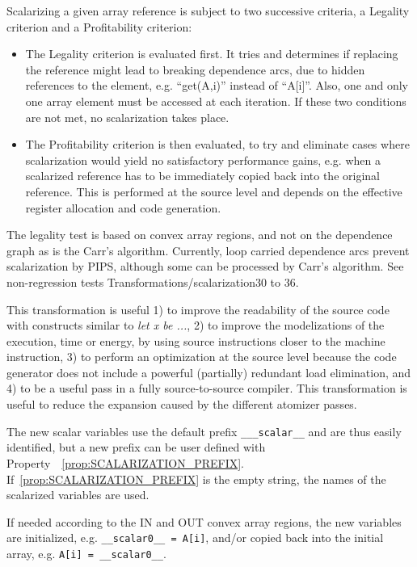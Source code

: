 \documentclass[a4paper]{report}
\newcommand{\PipsPropRef}[1]{\texttt{\detokenize{#1}}~\ref{prop:#1}}
\begin{document}
Scalarizing a given array reference is subject to two successive
criteria, a Legality criterion and a Profitability criterion:

\begin{itemize}
\item The Legality criterion is evaluated first. It tries and
  determines if replacing the reference might lead to breaking
  dependence arcs, due to hidden references to the element,
  e.g. ``get(A,i)'' instead of ``A[i]''. Also, one and only one array
  element must be accessed at each iteration. If these two conditions
  are not met, no scalarization takes place.

\item The Profitability criterion is then evaluated, to try and
  eliminate cases where scalarization would yield no satisfactory
  performance gains, e.g. when a scalarized reference has to be
  immediately copied back into the original reference. This is
  performed at the source level and depends on the effective register
  allocation and code generation.
\end{itemize}

The legality test is based on convex array regions, and not on the
dependence graph as is the Carr's algorithm. Currently, loop carried
dependence arcs prevent scalarization by PIPS, although some can be
processed by Carr's algorithm. See non-regression tests
Transformations/scalarization30 to 36.

This transformation is useful 1) to improve the readability of the
source code with constructs similar to {\em let x be ...}, 2) to
improve the modelizations of the execution, time or energy, by using
source instructions closer to the machine instruction, 3) to
perform an optimization at the source level because the code generator
does not include a powerful (partially) redundant load elimination,
and 4) to be a useful pass in a fully source-to-source compiler. This
transformation is useful to reduce the expansion caused by the
different atomizer passes.

The new scalar variables use the default prefix \verb/___scalar__/ and
are thus easily identified, but a new prefix can be user defined with
Property~\PipsPropRef{SCALARIZATION_PREFIX}. If\PipsPropRef{SCALARIZATION_PREFIX}
is the empty string, the names of the scalarized variables are used.

If needed according to the IN and OUT convex array regions, the new
variables are initialized, e.g. \verb/__scalar0__ = A[i]/, and/or
copied back into the initial array, e.g. \verb/A[i] = __scalar0__/.
\end{document}
